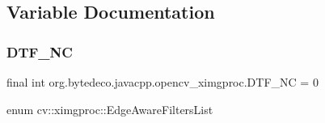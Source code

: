 \subsection{Variable Documentation}
\mbox{\label{group__ximgproc__filters_ga23e2b57a77b596c717a878099310808e}} 
\subsubsection{\texorpdfstring{D\+T\+F\+\_\+\+NC}{DTF\_NC}}
{\footnotesize\ttfamily final int org.\+bytedeco.\+javacpp.\+opencv\+\_\+ximgproc.\+D\+T\+F\+\_\+\+NC = 0\hspace{0.3cm}{\ttfamily [static]}}

enum cv\+::ximgproc\+::\+Edge\+Aware\+Filters\+List 